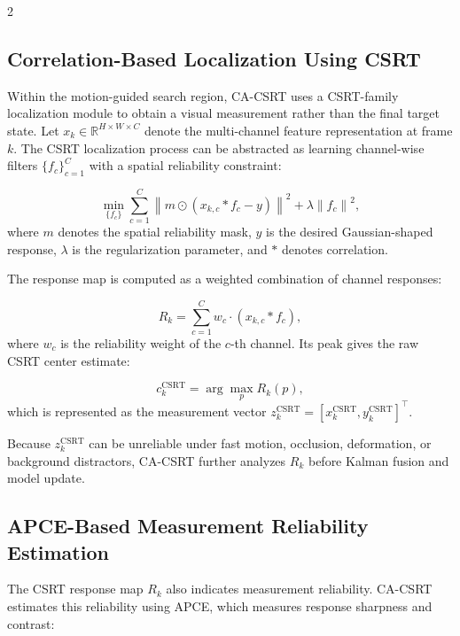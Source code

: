\documentclass[10pt,a4paper]{article}
\begin{document}
\begin{multicols}{2}

\subsection{Correlation-Based Localization Using CSRT}

Within the motion-guided search region, CA-CSRT uses a CSRT-family localization module to obtain a visual measurement rather than the final target state. Let $x_k \in \mathbb{R}^{H \times W \times C}$ denote the multi-channel feature representation at frame $k$. The CSRT localization process can be abstracted as learning channel-wise filters $\{f_c\}_{c=1}^{C}$ with a spatial reliability constraint:

\begin{equation}
\min_{\{f_c\}} \sum_{c=1}^{C}
\left\| m \odot (x_{k,c} * f_c - y) \right\|^2
+ \lambda \left\| f_c \right\|^2 ,
\end{equation}
where $m$ denotes the spatial reliability mask, $y$ is the desired Gaussian-shaped response, $\lambda$ is the regularization parameter, and $*$ denotes correlation.

The response map is computed as a weighted combination of channel responses:

\begin{equation}
R_k = \sum_{c=1}^{C} w_c \cdot (x_{k,c} * f_c),
\end{equation}
where $w_c$ is the reliability weight of the $c$-th channel. Its peak gives the raw CSRT center estimate:

\begin{equation}
c_k^{\mathrm{CSRT}} = \arg\max_{p} R_k(p),
\end{equation}
which is represented as the measurement vector
$z_k^{\mathrm{CSRT}} = [x_k^{\mathrm{CSRT}}, y_k^{\mathrm{CSRT}}]^{\top}$.

Because $z_k^{\mathrm{CSRT}}$ can be unreliable under fast motion, occlusion, deformation, or background distractors, CA-CSRT further analyzes $R_k$ before Kalman fusion and model update.

\subsection{APCE-Based Measurement Reliability Estimation}

The CSRT response map $R_k$ also indicates measurement reliability. CA-CSRT estimates this reliability using APCE, which measures response sharpness and contrast:


\end{multicols}
\end{document}
